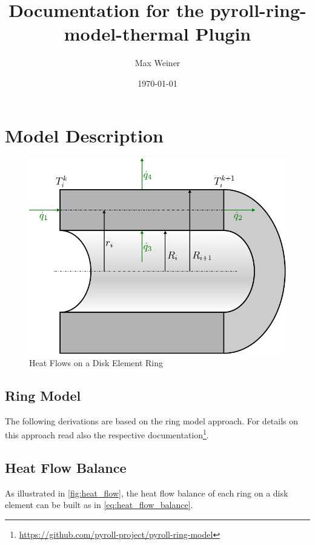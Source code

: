 \documentclass{scrartcl}
\begin{document}
    \title{Documentation for the pyroll-ring-model-thermal Plugin}
    \author{Max Weiner}
    \date{\today}

    \maketitle


    \section{Model Description}\label{sec:model-description}

    \begin{figure}
        \centering
        \includegraphics[scale=0.8]{img/heat_flow}
        \caption{Heat Flows on a Disk Element Ring}
        \label{fig:heat_flow}
    \end{figure}

    \subsection{Ring Model}

    The following derivations are based on the ring model approach.
    For details on this approach read also the respective documentation\footnote{\url{https://github.com/pyroll-project/pyroll-ring-model}}.

    \subsection{Heat Flow Balance}

    As illustrated in \autoref{fig:heat_flow}, the heat flow balance of each ring on a disk element can be built as in \autoref{eq:heat_flow_balance}.
\end{document}
